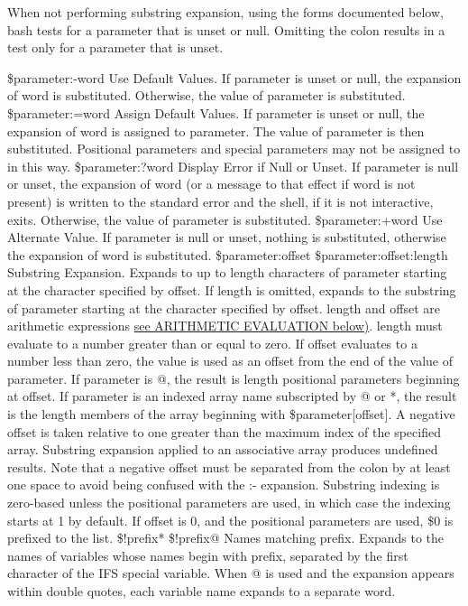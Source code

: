 {When not performing substring expansion, using the forms documented below, bash tests for a parameter that is unset or null. Omitting the colon results in a test only for a parameter that is unset.

\${parameter:-word}
Use Default Values. If parameter is unset or null, the expansion of word is substituted. Otherwise, the value of parameter is substituted.
\${parameter:=word}
Assign Default Values. If parameter is unset or null, the expansion of word is assigned to parameter. The value of parameter is then substituted. Positional parameters and special parameters may not be assigned to in this way.
\${parameter:?word}
Display Error if Null or Unset. If parameter is null or unset, the expansion of word (or a message to that effect if word is not present) is written to the standard error and the shell, if it is not interactive, exits. Otherwise, the value of parameter is substituted.
\${parameter:+word}
Use Alternate Value. If parameter is null or unset, nothing is substituted, otherwise the expansion of word is substituted.
\${parameter:offset}
\${parameter:offset:length}
Substring Expansion. Expands to up to length characters of parameter starting at the character specified by offset. If length is omitted, expands to the substring of parameter starting at the character specified by offset. length and offset are arithmetic expressions \hyperref[sec:arithmeticevaluation]{see ARITHMETIC EVALUATION below)}. length must evaluate to a number greater than or equal to zero. If offset evaluates to a number less than zero, the value is used as an offset from the end of the value of parameter. If parameter is @, the result is length positional parameters beginning at offset. If parameter is an indexed array name subscripted by @ or *, the result is the length members of the array beginning with \${parameter[offset]}. A negative offset is taken relative to one greater than the maximum index of the specified array. Substring expansion applied to an associative array produces undefined results. Note that a negative offset must be separated from the colon by at least one space to avoid being confused with the :- expansion. Substring indexing is zero-based unless the positional parameters are used, in which case the indexing starts at 1 by default. If offset is 0, and the positional parameters are used, \$0 is prefixed to the list.
\${!prefix*}
\${!prefix@}
Names matching prefix. Expands to the names of variables whose names begin with prefix, separated by the first character of the IFS special variable. When @ is used and the expansion appears within double quotes, each variable name expands to a separate word.
}
